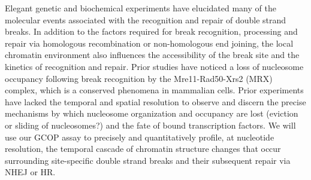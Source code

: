 {}
Elegant genetic and biochemical experiments have elucidated many of the molecular events associated with the recognition and repair of  double strand breaks\citep{Haber2016-ca,Lieber2010-cl,Renkawitz2014-jz,Jasin2013-fv}.
In addition to the factors required for break recognition, processing and repair via homologous recombination or non-homologous end joining, the local chromatin environment also influences the accessibility of the break site%
and the kinetics of recognition and repair\citep{Price2013-lp,Smerdon1991-sv}.
Prior studies have noticed a loss of nucleosome occupancy following break recognition by the Mre11-Rad50-Xrs2 (MRX) complex\citep{Tsukuda2005}, which is a conserved phenomena in mammalian cells\citep{Goldstein2013}.
Prior experiments have lacked the temporal and spatial resolution to observe %
and discern the precise mechanisms by which nucleosome organization and occupancy are lost (\eg eviction or sliding of nucleosomes?) and the fate of bound transcription factors.  We will use our GCOP assay to precisely and quantitatively profile, at nucleotide resolution, the temporal cascade of chromatin structure changes that occur surrounding site-specific double strand breaks and their subsequent repair via NHEJ or HR.


